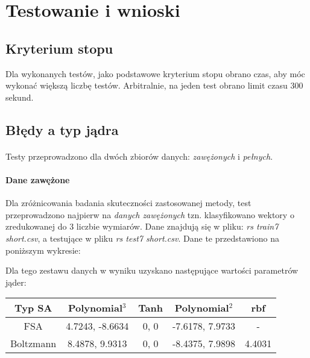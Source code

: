 \documentclass{article}
\begin{document}
\pagebreak
\section{Testowanie i wnioski}
\subsection{Kryterium stopu}
Dla wykonanych testów, jako podstawowe kryterium stopu obrano czas, aby móc wykonać większą liczbę testów. Arbitralnie, na jeden test obrano limit czasu 300 sekund.
\subsection{Błędy a typ jądra}
\paragraph{}
Testy przeprowadzono dla dwóch zbiorów danych: \textit{zawężonych} i \textit{pełnych}.
\paragraph {Dane zawężone} Dla zróżnicowania badania skuteczności zastosowanej metody, test przeprowadzono najpierw na \textit{danych zawężonych} tzn. klasyfikowano wektory o zredukowanej do 3 liczbie wymiarów. Dane znajdują się w pliku: \textit{rs train7 short.csv}, a testujące w pliku \textit{rs test7 short.csv}. Dane te przedstawiono na poniższym wykresie:
\pgfplotsset{width=6cm,compat=1.4}
\begin{center}
\end{center}

Dla tego zestawu danych w wyniku uzyskano następujące wartości parametrów jąder:

\begin{center}
    \begin{tabular}{ | c | c | c | c | c | }
    \hline
    Typ SA & \textbf{Polynomial}$^{3}$ & \textbf{Tanh} & \textbf{Polynomial$^{2}$} & \textbf{rbf} \\ \hline
    FSA & 4.7243, -8.6634 & 0, 0 & -7.6178, 7.9733 & - \\ \hline
	Boltzmann & 8.4878, 9.9313 & 0, 0 & -8.4375, 7.9898 & 4.4031\\ \hline
    \end{tabular}
\end{center}
\end{document}

